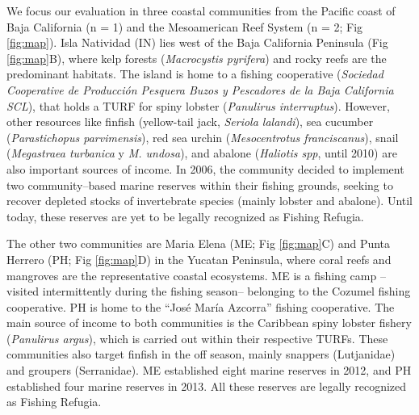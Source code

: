 \documentclass{frontiersSCNS}
\theoremstyle{definition}
\theoremstyle{definition}
\theoremstyle{definition}
\theoremstyle{remark}
\begin{document}
We focus our evaluation in three coastal communities from the Pacific
coast of Baja California (n = 1) and the Mesoamerican Reef System (n =
2; Fig \ref{fig:map}). Isla Natividad (IN) lies west of the Baja
California Peninsula (Fig \ref{fig:map}B), where kelp forests
(\emph{Macrocystis pyrifera}) and rocky reefs are the predominant
habitats. The island is home to a fishing cooperative (\emph{Sociedad
Cooperative de Producción Pesquera Buzos y Pescadores de la Baja
California SCL}), that holds a TURF for spiny lobster (\emph{Panulirus
interruptus}). However, other resources like finfish (yellow-tail jack,
\emph{Seriola lalandi}), sea cucumber (\emph{Parastichopus
parvimensis}), red sea urchin (\emph{Mesocentrotus franciscanus}), snail
(\emph{Megastraea turbanica} y \emph{M. undosa}), and abalone
(\emph{Haliotis spp}, until 2010) are also important sources of income.
In 2006, the community decided to implement two community--based marine
reserves within their fishing grounds, seeking to recover depleted
stocks of invertebrate species (mainly lobster and abalone). Until
today, these reserves are yet to be legally recognized as Fishing
Refugia.

The other two communities are Maria Elena (ME; Fig \ref{fig:map}C) and
Punta Herrero (PH; Fig \ref{fig:map}D) in the Yucatan Peninsula, where
coral reefs and mangroves are the representative coastal ecosystems. ME
is a fishing camp --visited intermittently during the fishing season--
belonging to the Cozumel fishing cooperative. PH is home to the ``José
María Azcorra'' fishing cooperative. The main source of income to both
communities is the Caribbean spiny lobster fishery (\emph{Panulirus
argus}), which is carried out within their respective TURFs. These
communities also target finfish in the off season, mainly snappers
(Lutjanidae) and groupers (Serranidae). ME established eight marine
reserves in 2012, and PH established four marine reserves in 2013. All
these reserves are legally recognized as Fishing Refugia.
\end{document}

